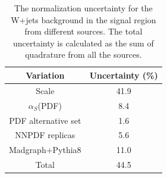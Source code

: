 \begin{table}[htbp!]
\begin{center}
\begin{tabular}{c|c}
Variation  &  Uncertainty (\%) \\
\hline
Scale                 &   41.9  \\
$\alpha_{S}$(PDF)     &   8.4   \\
PDF alternative set   &   1.6   \\
NNPDF replicas        &   5.6   \\
Madgraph+Pythia8      &   11.0   \\
\hline
Total                 &   44.5  \\
\end{tabular}
\end{center}
\caption{The normalization uncertainty for the W+jets background in the signal region
from different sources. The total uncertainty is calculated as the sum of quadrature from all
the sources.}
\label{tab:boosted_unc_wjets}
\end{table}
 
